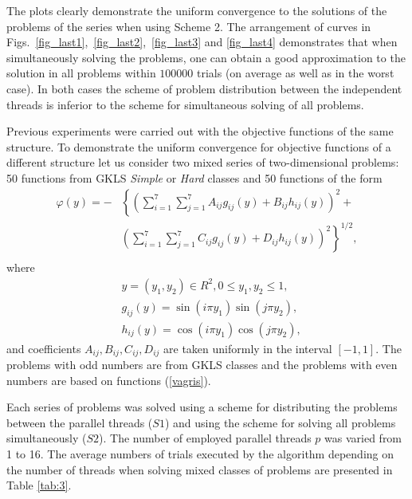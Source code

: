 \documentclass[smallcondensed]{svjour3}     %
\begin{document}
The plots clearly demonstrate the uniform convergence to the solutions of the problems of the series when using Scheme 2. The arrangement of curves in Figs.~\ref{fig_last1},~\ref{fig_last2},~\ref{fig_last3} and \ref{fig_last4} demonstrates that when simultaneously solving the problems, one can obtain a good approximation to the solution in all problems within $100 000$ trials (on average as well as in the worst case). In both cases the scheme of problem distribution between the independent threads is inferior to the scheme for simultaneous solving of all problems.


Previous experiments were carried out with the objective functions of the same structure. To demonstrate the uniform convergence for objective functions of a different structure let us consider two mixed series of two-dimensional problems: 50 functions from GKLS \textit{Simple} or \textit{Hard} classes and 50 functions of the form
\begin{eqnarray} \nonumber \label{vagris}
\varphi(y)= -&\left\{\left(\sum^{7}_{i=1}\sum^{7}_{j=1}A_{ij}g_{ij}(y)+B_{ij}h_{ij}(y)\right)^2+\right. \\
&\left.\left(\sum^{7}_{i=1}\sum^{7}_{j=1}C_{ij}g_{ij}(y)+D_{ij}h_{ij}(y)\right)^2\right\}^{1/2},\\ \nonumber
\end{eqnarray}
where
\begin{eqnarray} \nonumber
& y=(y_1,y_2)\in R^2, 0 \leq y_1,y_2 \leq 1, \\ \nonumber
& g_{ij}(y)=\sin(i\pi y_1)\sin(j\pi y_2),  \\ \nonumber
& h_{ij}(y)=\cos(i\pi y_1)\cos(j\pi y_2), \nonumber 
\end{eqnarray}
and coefficients $A_{ij}, B_{ij}, C_{ij}, D_{ij}$  are taken uniformly in the interval $[-1,1]$. The problems with odd numbers are from GKLS classes and the problems with even numbers are based on functions (\ref{vagris}).

Each series of problems was solved using a scheme for distributing the problems between the parallel threads ($S1$) and using the scheme for solving all problems simultaneously ($S2$). The number of employed parallel threads $p$ was varied from 1 to 16. The average numbers of trials executed by the algorithm depending on the number of threads when solving mixed classes of problems are presented in Table \ref{tab:3}.
\end{document}
